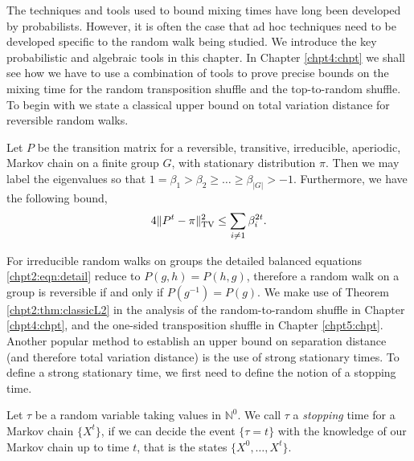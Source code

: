 \documentclass[11pt]{report}
\begin{document}
The techniques and tools used to 
bound mixing times have long been developed by probabilists. However, it is often the case that ad hoc techniques need to be developed specific to the random walk being studied. We 
introduce the key probabilistic and algebraic tools in this chapter.  In Chapter \ref{chpt4:chpt} we shall see how we have to use a 
combination of tools to prove precise bounds on the mixing time for the 
random transposition shuffle and the top-to-random shuffle. To begin with we state a 
classical upper bound on total variation distance for reversible random walks. 

\begin{thm}
	\label{chpt2:thm:classicL2}
	Let $P$ be the transition matrix for a reversible, transitive, irreducible, 
	aperiodic, 	Markov chain on a finite group $G$, 
	with stationary distribution $\pi$. Then we may label the eigenvalues so that $1=\beta_{1} > \beta_{2} \geq \dots \geq 
	\beta_{|G|} >-1$. Furthermore, we have the following bound,
	\begin{eqnarray}
	\label{chpt2:eqn:classicalL2}
	4\lVert P^{t} - \pi \rVert^{2}_{\textnormal{TV}} \leq \sum_{i\neq 1} 
	\beta_{i}^{2t} .
	\end{eqnarray}	
\end{thm}


For irreducible random walks on groups the 
detailed balanced equations \eqref{chpt2:eqn:detail} reduce to $P(g,h) = 
P(h,g)$, therefore a random walk on a group is reversible if and only if $P(g^{-1}) =P(g)$. We make use of Theorem \ref{chpt2:thm:classicL2} in the analysis of the random-to-random shuffle in Chapter \ref{chpt4:chpt}, and the one-sided transposition shuffle in Chapter \ref{chpt5:chpt}. Another popular method to establish an upper bound on separation distance (and therefore total variation distance) is the use of strong stationary times. To 
define a strong stationary time, we first need to define the notion of a 
stopping time.

\begin{defn}
	Let $\tau$ be a random variable taking values in $\mathbb{N}^{0}$. We call 
	$\tau$ 
	a \emph{stopping} time for a Markov chain $\{X^{t}\}$, if we can decide 
	the event $\{\tau = t\}$ with the knowledge of our Markov chain up to time $t$, that is the states $\{X^{0}, \ldots, X^{t}\}$.
\end{defn}
\end{document}
